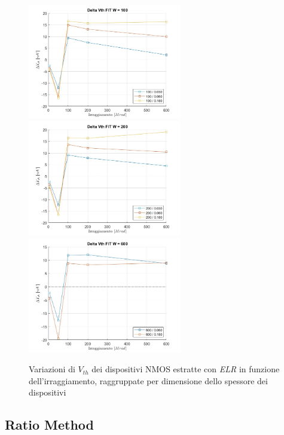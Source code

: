 \documentclass[12pt, letterpaper]{book}
\begin{document}
\begin{figure}[H]
  \centering
  \includegraphics[width=0.6\textwidth]{sovrapposizione-deltaVth-FIT-N100}
  \includegraphics[width=0.6\textwidth]{sovrapposizione-deltaVth-FIT-N200}
  \includegraphics[width=0.6\textwidth]{sovrapposizione-deltaVth-FIT-N600}
  \caption{Variazioni di $V_{th}$ dei dispositivi NMOS estratte con \emph{ELR} in funzione dell'irraggiamento, raggruppate per dimensione dello spessore dei dispositivi}
\end{figure}






\subsection{Ratio Method}
\end{document}
